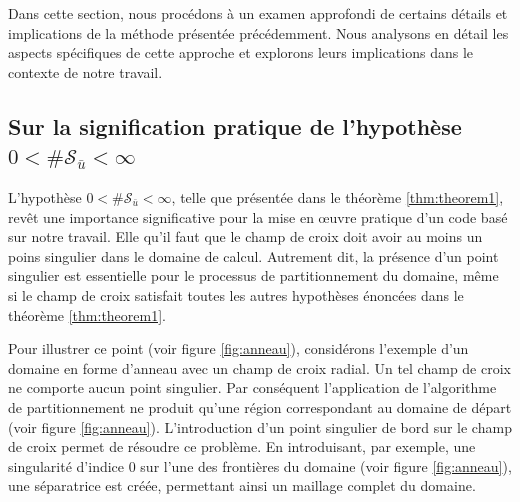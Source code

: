 Dans cette section, nous procédons à un examen approfondi de certains détails et implications de la méthode présentée précédemment. Nous analysons en détail les aspects spécifiques de cette approche et explorons leurs implications dans le contexte de notre travail.

\subsection{Sur la signification pratique de l'hypothèse $0<\#\mathcal{S}_{\bar{u}}<\infty$}

L'hypothèse $0<\#\mathcal{S}_{\bar{u}}<\infty$, telle que présentée dans le théorème \ref{thm:theorem1}, revêt une importance significative pour la mise en œuvre pratique d'un code basé sur notre travail. Elle qu'il faut que le champ de croix doit avoir au moins un poins singulier dans le domaine de calcul. Autrement dit, la présence d'un point singulier est essentielle pour le processus de partitionnement du domaine, même si le champ de croix satisfait toutes les autres hypothèses énoncées dans le théorème \ref{thm:theorem1}.

Pour illustrer ce point (voir figure \ref{fig:anneau}), considérons l'exemple d'un domaine en forme d'anneau avec un champ de croix radial. Un tel champ de croix ne comporte aucun point singulier. Par conséquent l'application de l'algorithme de partitionnement ne produit qu'une région correspondant au domaine de départ (voir figure \ref{fig:anneau}). L'introduction d'un point singulier de bord sur le champ de croix permet de résoudre ce problème. En introduisant, par exemple, une singularité d'indice 0 sur l'une des frontières du domaine (voir figure \ref{fig:anneau}), une séparatrice est créée, permettant ainsi un maillage complet du domaine.

